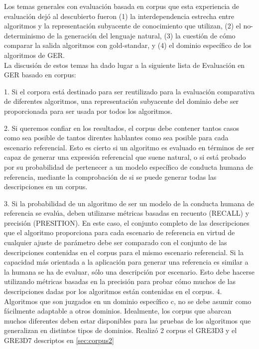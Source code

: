 Los temas generales con evaluaci\'on basada en corpus que esta experiencia de evaluaci\'on dej\'o
al descubierto fueron (1) la interdependencia estrecha entre algoritmos y la
representaci\'on subyacente de conocimiento que utilizan, (2) el no-determinismo de la generaci\'on del lenguaje natural, (3) la cuesti\'on de c\'omo comparar la salida algoritmos con gold-standar, y (4) el dominio espec\'ifico de los algoritmos de GER.\\
La discusi\'on de estos temas ha dado lugar a la siguiente lista de Evaluaci\'on en GER basado en corpus:

1. Si el corpora est\'a destinado para ser reutilizado para la evaluaci\'on comparativa de diferentes
algoritmos, una representaci\'on subyacente del dominio debe ser proporcionada para ser usada por todos los algoritmos.

2. Si queremos confiar en los resultados, el corpus debe contener tantos casos como sea posible de tantos direntes hablantes como sea posible para cada escenario referencial. 
Esto es cierto si un algoritmo es evaluado en t\'erminos de ser capaz de generar una expresi\'on referencial que suene natural, o si est\'a probado por su probabilidad de pertenecer a un modelo espec\'ifico de conducta humana de referencia, mediante la comprobaci\'on de si se puede generar todas las descripciones en un corpus.

3. Si la probabilidad de un algoritmo de ser un modelo de la conducta humana de referencia
se eval\'ua, deben utilizarse m\'etricas basadas en recuento (RECALL) y precisi\'on (PRESITION). En este
caso, el conjunto completo de las descripciones que el algoritmo proporciona para cada
escenario de referencia en virtud de cualquier ajuste de par\'ametro debe ser comparado con el
conjunto de las descripciones contenidas en el corpus para el mismo escenario referencial.
Si la capacidad m\'as orientada a la aplicaci\'on para generar una referencia es similar a la humana
se ha de evaluar, s\'olo una descripci\'on por escenario.
Esto debe hacerse utilizando m\'etricas basadas en la precisi\'on para probar c\'omo muchos de las
descripciones dadas por los algoritmos est\'an contenidas en el corpus.
4. Algoritmos que son juzgados en un dominio espec\'ifico c, no se debe asumir como
f\'acilmente adaptable a otros dominios. Idealmente, los corpus que abarcan muchos diferentes
deben estar disponibles para las pruebas de los algoritmos que generalizan en distintos tipos de dominios.
Realiz\'o 2 corpus el GRE3D3 y el GRE3D7 descriptos en \ref{sec:corpus2}

